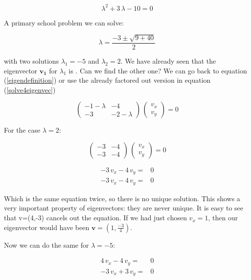 \documentclass[12pt]{article}
\begin{document}
\begin{equation}
	\lambda^2  +3 \,  \lambda  - 10 = 0 \nonumber
\end{equation}

A primary school problem we can solve:

\begin{equation}
	\lambda= \frac{-3 \pm \sqrt{9+40}}{2} \nonumber
\end{equation}

with two solutions $\lambda_1=-5$ and $\lambda_2=2$. We have already seen that the eigenvector $\mathbf{v_1}$ for $\lambda_1$ is . Can we find the other one? We can go back to equation (\ref{eigendefinition}) or use the already factored out version in equation  (\ref{solve4eigenvec})

\begin{equation}
\begin{pmatrix} -1-\lambda & -4\\ -3 & -2-\lambda\end{pmatrix} \, \begin{pmatrix} v_x \\  v_y\end{pmatrix} = 0 \nonumber
\end{equation}

For the case $\lambda = 2$:

\begin{equation}
	\begin{pmatrix} -3 & -4\\ -3 & -4\end{pmatrix} \, \begin{pmatrix} v_x \\  v_y\end{pmatrix} = 0 \nonumber
\end{equation}

\begin{align*}
	-3 \, v_x - 4 \, v_y =& 0 \nonumber\\
	-3 \, v_x - 4 \, v_y =& 0 \nonumber
\end{align*}

Which is the same equation twice, so there is no unique solution. This shows a very important property of eigenvectors: they are never unique. It is easy to see that v=(4,-3) cancels out the equation. If we had just chosen $v_x=1$, then our eigenvector would have been $\mathbf{v}=\left( 1,\frac{-3}{4} \right)$.

Now we can do the same for  $\lambda = -5$:

\begin{align*}
	4 \, v_x - 4 \, v_y =& 0 \nonumber\\
	- 3 \, v_x  + 3 \, v_y =& 0 \nonumber
\end{align*}
\end{document}
